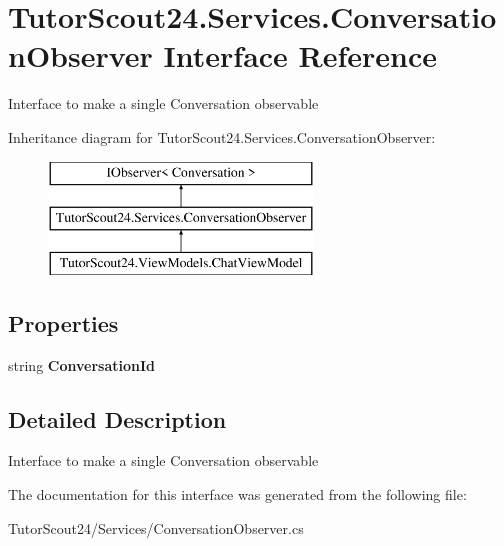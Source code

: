 \hypertarget{interface_tutor_scout24_1_1_services_1_1_conversation_observer}{}\section{Tutor\+Scout24.\+Services.\+Conversation\+Observer Interface Reference}
\label{interface_tutor_scout24_1_1_services_1_1_conversation_observer}


Interface to make a single Conversation observable  


Inheritance diagram for Tutor\+Scout24.\+Services.\+Conversation\+Observer\+:\begin{figure}[H]
\begin{center}
\leavevmode
\includegraphics[height=3.000000cm]{interface_tutor_scout24_1_1_services_1_1_conversation_observer}
\end{center}
\end{figure}
\subsection*{Properties}
\begin{DoxyCompactItemize}
\item 
\mbox{\label{interface_tutor_scout24_1_1_services_1_1_conversation_observer_a0dce094ac41f973ab6640c36ca71e91b}} 
string {\bfseries Conversation\+Id}
\end{DoxyCompactItemize}


\subsection{Detailed Description}
Interface to make a single Conversation observable 



The documentation for this interface was generated from the following file\+:\begin{DoxyCompactItemize}
\item 
Tutor\+Scout24/\+Services/Conversation\+Observer.\+cs\end{DoxyCompactItemize}
